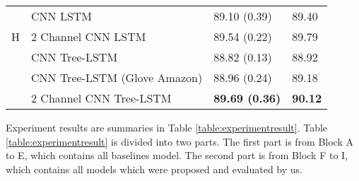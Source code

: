 \begin{table}[H]
\begin{tabular}{c|lll}
\hline
\hline
        \multirow{3}{*}{H} & CNN LSTM                                 & 89.10 (0.39)  & 89.40 \Tstrut  \\
        & 2 Channel CNN LSTM                        & 89.54    (0.22) & 89.79    \\
\hline
        \multirow{4}{*}{I} & CNN Tree-LSTM                            & 88.82 (0.13) & 88.92 \\
        & CNN Tree-LSTM (Glove Amazon)             & 88.96 (0.24) & 89.18 \\
        & 2 Channel CNN Tree-LSTM  &\textbf{89.69 (0.36)} & \textbf{90.12}    \\
    \end{tabular}
\end{table}



Experiment results are summaries in Table \ref{table:experimentresult}.
Table \ref{table:experimentresult} is divided into two parts.
The first part is from Block A to E, which contains all baselines model.
The second part is from Block F to I, which contains all models which were proposed and evaluated by us.

